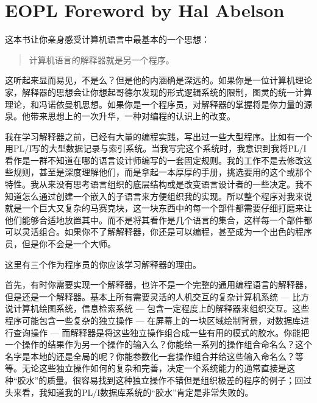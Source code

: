 \section*{EOPL Foreword by Hal Abelson}
\trancontent
这本书让你亲身感受计算机语言中最基本的一个思想：

\begin{quotation}
计算机语言的解释器就是另一个程序。
\end{quotation}

这听起来显而易见，不是么？但是他的内涵确是深远的。如果你是一位计算机理论家，解释器的思想会让你想起哥德尔发现的形式逻辑系统的限制，图灵的统一计算理论，和冯诺依曼机思想。如果你是一个程序员，对解释器的掌握将是你力量的源泉。他带来思想上的一次升华，一种对编程的认识上的改变。

我在学习解释器之前，已经有大量的编程实践，写出过一些大型程序。比如有一个用PL/I写的大型数据记录与索引系统。当我写完这个系统时，我意识到我将PL/I看作是一群不知道在哪的语言设计师编写的一套固定规则。我的工作不是去修改这些规则，甚至是深度理解他们，而是拿起一本厚厚的手册，挑选要用的这个或那个特性。我从来没有思考语言组织的底层结构或是改变语言设计者的一些决定。我不知道怎么通过创建一个嵌入的子语言来方便组织我的实现。所以整个程序对我来说就是一个巨大又复杂的马赛克块，这一块东西中的每一个部件都需要仔细打磨来让他们能够合适地放置其中。而不是将其看作是几个语言的集合，这样每一个部件都可以灵活组合。如果你不了解解释器，你还是可以编程，甚至成为一个出色的程序员，但是你不会是一个大师。

这里有三个作为程序员的你应该学习解释器的理由。

首先，有时你需要实现一个解释器，也许不是一个完整的通用编程语言的解释器，但是还是一个解释器。基本上所有需要灵活的人机交互的复杂计算机系统 --- 比方说计算机绘图系统，信息检索系统 --- 包含一定程度上的解释器来组织交互。这些程序可能包含一些复杂的独立操作 --- 在屏幕上的一块区域绘制背景，对数据库进行查询操作 --- 而解释器是将这些独立操作组合成一些有用的模式的胶水。你能把一个操作的结果作为另一个操作的输入么？你能给一系列的操作组合命名么？这个名字是本地的还是全局的呢？你能参数化一套操作组合并给这些输入命名么？等等。无论这些独立操作如何的复杂和完善，决定一个系统能力的通常直接是这种``胶水''的质量。很容易找到这种独立操作不错但是组织极差的程序的例子；回过头来看，我知道我的PL/I数据库系统的``胶水''肯定是非常失败的。

